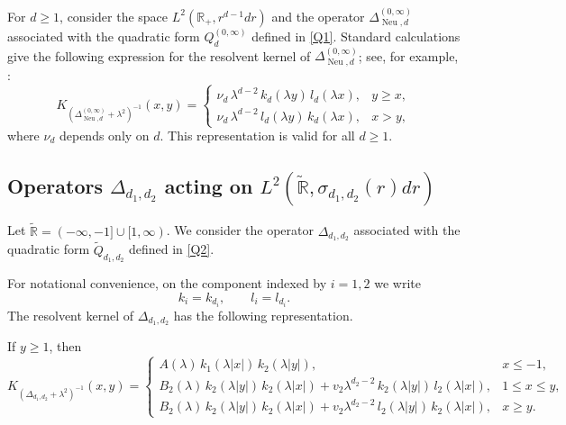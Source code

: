 \documentclass[12pt]{amsart}
\newcommand\Neu{\operatorname{Neu}}
\newcommand\LapoN{\Delta^{(0, \infty)}_{\Neu, d}}
\newcommand\Lapd{\Delta_{d_1, d_2}}
\begin{document}
For $d\ge 1$, consider the space $L^2(\mathbb R_+, r^{d-1}dr)$ and the operator
$\LapoN$ associated with the quadratic form $Q_d^{(0,\infty)}$ defined in
\eqref{Q1}. Standard calculations give the following expression for the resolvent
kernel of $\LapoN$; see, for example, \cite{HS1D}:
\begin{equation}\label{laponker}
K_{(\LapoN + \lambda^2)^{-1}}(x,y)
=
\begin{cases}
\nu_d\, \lambda^{d-2}\, k_d(\lambda y)\, l_d(\lambda x), & y \ge x,\\[2mm]
\nu_d\, \lambda^{d-2}\, l_d(\lambda y)\, k_d(\lambda x), & x > y,
\end{cases}
\end{equation}
where $\nu_d$ depends only on $d$. This representation is valid for all $d\ge 1$.

\subsection{Operators \texorpdfstring{$\Lapd$}{Lapd} acting on
\texorpdfstring{$L^2(\widetilde{\mathbb R}, \sigma_{d_1,d_2}(r)dr)$}{L22}}
\label{seclap}

Let $\widetilde{\mathbb R}=(-\infty,-1]\cup[1,\infty)$. We consider the operator
$\Lapd$ associated with the quadratic form $\widetilde{Q}_{d_1,d_2}$ defined in
\eqref{Q2}.

For notational convenience, on the component indexed by $i=1,2$ we write
\[
k_i = k_{d_i}, \qquad l_i = l_{d_i}.
\]
The resolvent kernel of $\Lapd$ has the following representation.

If $y \ge 1$, then
\begin{equation}\label{eq_y>1}
K_{(\Lapd + \lambda^2)^{-1}}(x,y)
=
\begin{cases}
A(\lambda)\, k_1(\lambda|x|)\, k_2(\lambda|y|), & x \le -1,\\[2mm]
B_2(\lambda)\, k_2(\lambda|y|)\, k_2(\lambda|x|)
+ v_2 \lambda^{d_2-2}\, k_2(\lambda|y|)\, l_2(\lambda|x|), & 1 \le x \le y,\\[2mm]
B_2(\lambda)\, k_2(\lambda|y|)\, k_2(\lambda|x|)
+ v_2 \lambda^{d_2-2}\, l_2(\lambda|y|)\, k_2(\lambda|x|), & x \ge y.
\end{cases}
\end{equation}
\end{document}
